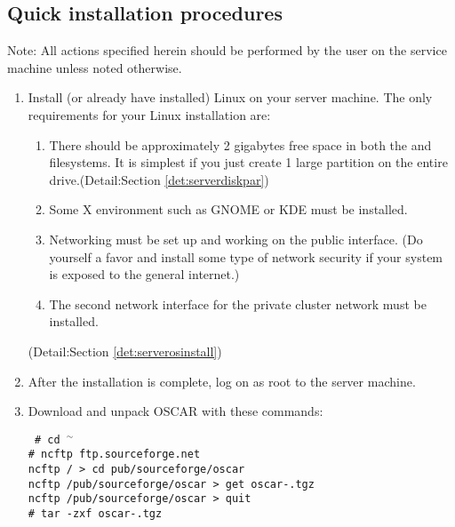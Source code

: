 \subsection{Quick installation procedures}

Note: All actions specified herein should be performed by the
 user on the service machine unless noted otherwise.

\begin {enumerate}

\item Install (or already have installed) Linux on your server machine.
The only requirements for your Linux installation are:

        \begin{enumerate}
        \item There should be approximately 2 gigabytes free space in both
        the \file{/} and  filesystems. It is simplest if you
        just create 1 large partition on the entire drive.(Detail:Section
        \ref{det:serverdiskpar})
        \item Some X environment such as GNOME or KDE must be installed.
        \item Networking must be set up and working on the public interface.
        (Do yourself a favor and install some type of network security if
        your system is exposed to the general internet.)
        \item The second network interface for the private cluster network
        must be installed.
        \end{enumerate}
(Detail:Section \ref{det:serverosinstall})

\item After the installation is complete, log on as root to the server 
machine.

\item Download and unpack OSCAR with these commands:

\vspace{11pt}
{\tt
  \# cd $^\sim$ \\
  \# ncftp ftp.sourceforge.net \\
  ncftp / > cd pub/sourceforge/oscar \\
  ncftp /pub/sourceforge/oscar > get oscar-\oscarversion.tgz \\
  ncftp /pub/sourceforge/oscar > quit \\
  \# tar -zxf oscar-\oscarversion.tgz
}
\vspace{11pt}


\end{enumerate}
